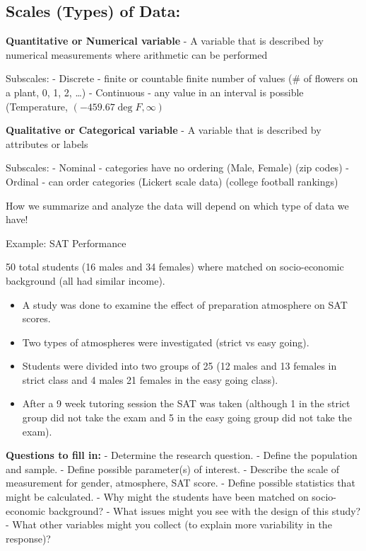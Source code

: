 \documentclass[
]{book}
\providecommand{\tightlist}{%
  \setlength{\itemsep}{0pt}\setlength{\parskip}{0pt}}
\theoremstyle{definition}
\theoremstyle{definition}
\theoremstyle{definition}
\theoremstyle{remark}
\begin{document}
\hypertarget{scales-types-of-data}{%
\subsection{Scales (Types) of Data:}\label{scales-types-of-data}}

\textbf{Quantitative or Numerical variable} - A variable that is described by numerical measurements where arithmetic can be performed

Subscales:
- Discrete - finite or countable finite number of values (\# of flowers on a plant, 0, 1, 2, \ldots{})
- Continuous - any value in an interval is possible (Temperature, \((-459.67\deg F, \infty)\)

\textbf{Qualitative or Categorical variable} - A variable that is described by attributes or labels

Subscales:
- Nominal - categories have no ordering (Male, Female) (zip codes)
- Ordinal - can order categories (Lickert scale data) (college football rankings)

How we summarize and analyze the data will depend on which type of data we have!

Example: SAT Performance

50 total students (16 males and 34 females) where matched on socio-economic background (all had similar income).

\begin{itemize}
\tightlist
\item
  A study was done to examine the effect of preparation atmosphere on SAT scores.\\
\item
  Two types of atmospheres were investigated (strict vs easy going).
\item
  Students were divided into two groups of 25 (12 males and 13 females in strict class and 4 males 21 females in the easy going class).
\item
  After a 9 week tutoring session the SAT was taken (although 1 in the strict group did not take the exam and 5 in the easy going group did not take the exam).
\end{itemize}

\textbf{Questions to fill in:}
- Determine the research question.
- Define the population and sample.
- Define possible parameter(s) of interest.
- Describe the scale of measurement for gender, atmosphere, SAT score.
- Define possible statistics that might be calculated.
- Why might the students have been matched on socio-economic background?
- What issues might you see with the design of this study?
- What other variables might you collect (to explain more variability in the response)?
\end{document}
